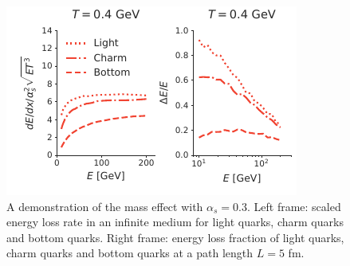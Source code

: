 \documentclass[aps, prc, reprint, amsmath, groupedaddress, nofootinbib]{revtex4-1}
\begin{document}
\begin{figure}
\includegraphics[width=\columnwidth]{Eloss_mass.pdf}
\caption{A demonstration of the mass effect with $\alpha_s=0.3$. Left frame: scaled energy loss rate in an infinite medium for light quarks, charm quarks and bottom quarks. Right frame: energy loss fraction of light quarks, charm quarks and bottom quarks at a path length $L=5$ fm.  }
\label{fig:mass}
\end{figure}
\end{document}
